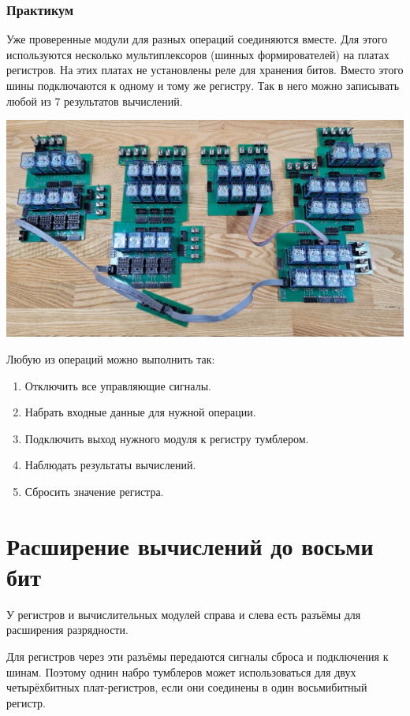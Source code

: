 \documentclass{book}
\begin{document}
\subsubsection{Практикум}

Уже проверенные модули для разных операций соединяются вместе.
Для этого используются несколько мультиплексоров (шинных формирователей)
на платах регистров. На этих платах не установлены реле для хранения
битов. Вместо этого шины подключаются к одному и тому же регистру.
Так в него можно записывать любой из $7$ результатов вычислений.

\includegraphics[width=\columnwidth]{photo/calculator.jpg}

Любую из операций можно выполнить так:

\begin{enumerate}
    \item Отключить все управляющие сигналы.
    \item Набрать входные данные для нужной операции.
    \item Подключить выход нужного модуля к регистру тумблером.
    \item Наблюдать результаты вычислений.
    \item Сбросить значение регистра.
\end{enumerate}


\section{Расширение вычислений до восьми бит}

У регистров и вычислительных модулей справа и слева есть разъёмы для расширения разрядности.

Для регистров через эти разъёмы передаются сигналы сброса и подключения к шинам. Поэтому
однин набро тумблеров может использоваться для двух четырёхбитных плат-регистров, если они
соединены в один восьмибитный регистр.
\end{document}
